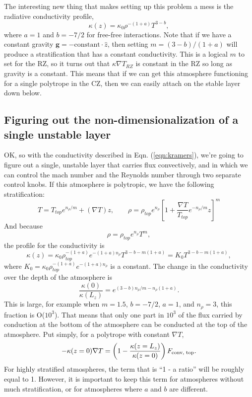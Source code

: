 \documentclass[aps, pre, onecolumn, nofootinbib, notitlepage, groupedaddress, amsfonts, amssymb, amsmath, longbibliography]{revtex4-1}
\newcommand{\grad}{\ensuremath{\nabla}}
\begin{document}
The interesting new thing that makes setting up this problem a mess is the 
radiative conductivity profile,
\begin{equation}
\kappa(z) = \kappa_0 \rho^{-(1+a)}T^{3-b},
\label{eqn:kramers}
\end{equation}
where $a = 1$ and $b = -7/2$ for free-free interactions. Note that if we have
a constant gravity $\bm{g} = -\text{constant}\cdot\hat{z}$, then setting
$m = (3 - b) / (1 + a)$ will produce a stratification that has a constant
conductivity. This is a logical $m$ to set for the RZ, so it turns out that
$\kappa \grad T_{RZ}$ is constant in the RZ so long as gravity is a constant.
This means that if we can get this atmosphere functioning for a single polytrope
in the CZ, then we can easily attach on the stable layer down below.

\subsection{Figuring out the non-dimensionalization of a single unstable layer}
OK, so with the conductivity described in Eqn. (\ref{eqn:kramers}), we're going
to figure out a single, unstable layer that carries flux convectively, and in which
we can control the mach number and the Reynolds number through two separate control
knobs. If this atmosphere is polytropic, we have the following stratification:
\begin{equation}
T = T_{top}e^{n_\rho / m} + (\grad T)z, \qquad 
\rho = \rho_{top}e^{n_\rho}
\left[1 + \frac{\grad T}{T_{top}}e^{-n_\rho/m}z\right]^m
\end{equation}
And because
$$
\rho = \rho_{top}e^{n_\rho} T^m,
$$
the profile for the conductivity is
\begin{equation}
\kappa(z) = \kappa_0 \rho_{top}^{-(1+a)} e^{-(1+a)n_{\rho}} T^{3 - b - m(1+a)}
= K_0 T^{3 - b - m(1+a)},
\end{equation}
where $K_0 = \kappa_0\rho_{top}^{-(1+a)} e^{-(1+a)n_{\rho}}$ is a constant. The
change in the conductivity over the depth of the atmosphere is
$$
\frac{\kappa(0)}{\kappa(L_z)} = e^{(3-b)n_\rho/m - n_\rho(1+a)}.
$$
This is large, for example when $m = 1.5$, $b = -7/2$, $a = 1$, and $n_\rho = 3$, 
this fraction is O($10^3$). That means that only one part in $10^3$ of the flux
carried by conduction at the bottom of the atmosphere can be conducted at the top
of the atmosphere. Put simply, for a polytrope with constant $\grad T$,
\begin{equation}
-\kappa(z=0)\grad T = 
\left(1 - \frac{\kappa(z=L_z)}{\kappa(z=0)}\right)F_{\text{\text{conv, top}}}.
\end{equation}
For highly stratified atmospheres, the term that is ``1 - a ratio'' will be
roughly equal to 1. However, it is important to keep this term for atmospheres
without much stratification, or for atmospheres where $a$ and $b$ are different.
\end{document}

